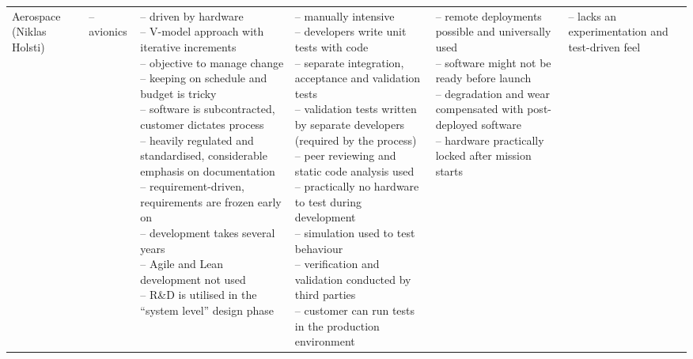\documentclass[english]{tktltiki2}
\begin{document}
\begin{landscape}
\begin{longtable}{|p{2.5cm}|p{1.5cm}|p{4cm}|p{4cm}|p{4cm}|p{4cm}|}
        Aerospace (Niklas Holsti) &
        – avionics &
        \parbox[t]{4cm}{– driven by hardware \\
                        – V-model approach with iterative increments \\
                        – objective to manage change \\
                        – keeping on schedule and budget is tricky \\
                        – software is subcontracted, customer dictates process \\
                        – heavily regulated and standardised, considerable emphasis on documentation \\
                        – requirement-driven, requirements are frozen early on \\
                        – development takes several years \\
                        – Agile and Lean development not used \\
                        – R\&D is utilised in the “system level” design phase} &
        \parbox[t]{4cm}{– manually intensive \\
                        – developers write unit tests with code \\
                        – separate integration, acceptance and validation tests \\
                        – validation tests written by separate developers (required by the process) \\
                        – peer reviewing and static code analysis used \\
                        – practically no hardware to test during development \\
                        – simulation used to test behaviour \\
                        – verification and validation conducted by third parties \\
                        – customer can run tests in the production environment} &
        \parbox[t]{4cm}{– remote deployments possible and universally used \\
                        – software might not be ready before launch \\
                        – degradation and wear compensated with post-deployed software \\
                        – hardware practically locked after mission starts} &
        \parbox[t]{4cm}{– lacks an experimentation and test-driven feel \\
}
\end{longtable}
\end{landscape}
\end{document}
